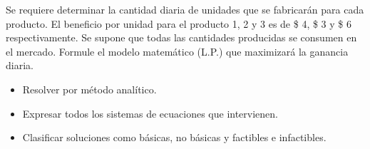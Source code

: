 \documentclass[spanish,letterpaper,11pt]{exam}
\begin{document}
\begin{questions}
   Se requiere determinar la cantidad diaria de unidades que se fabricarán para cada producto. El beneficio por unidad para el producto 1, 2 y 3 es de \$ 4, \$ 3 y \$ 6 respectivamente. Se supone que todas las cantidades producidas se consumen en el mercado. Formule el modelo matemático (L.P.) que maximizará la ganancia diaria. 
   
   \begin{itemize}
       \item Resolver por método analítico. 
       \item Expresar todos los sistemas de ecuaciones que intervienen. 
       \item Clasificar soluciones como básicas, no básicas y factibles e infactibles.
   \end{itemize}

   \begin{solution}
       
   \end{solution}
\end{questions}
\end{document}
